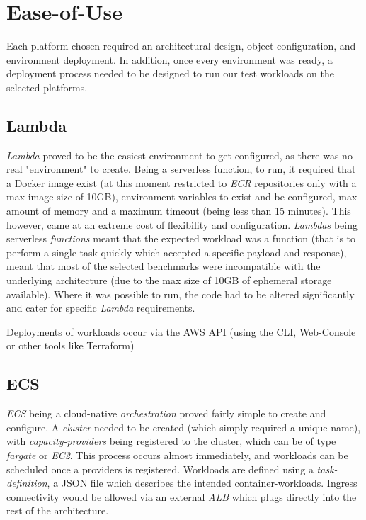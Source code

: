 \section{Ease-of-Use}
Each platform chosen required an architectural design, object configuration, and environment deployment.
In addition, once every environment was ready, a deployment process needed to be designed to run our test workloads on the selected platforms.

\subsection{Lambda}
\textit{Lambda} proved to be the easiest environment to get configured, as there was no real "environment" to create. Being a serverless function,
to run, it required that a Docker image exist (at this moment restricted to \textit{ECR} repositories only with a max image size of 10GB), environment variables to exist and be configured, max amount of memory
and a maximum timeout (being less than 15 minutes). This however, came at an extreme cost of flexibility and configuration.
\textit{Lambdas} being serverless \emph{functions} meant that the expected workload was a function (that is to perform a single task quickly which accepted a specific payload and response),
meant that most of the selected benchmarks were incompatible with the underlying architecture (due to the max size of 10GB of ephemeral storage available).
Where it was possible to run, the code had to be altered significantly and cater for specific \textit{Lambda} requirements.

Deployments of workloads occur via the AWS API (using the CLI, Web-Console or other tools like Terraform)

\subsection{ECS}
\textit{ECS} being a cloud-native \textit{orchestration} proved fairly simple to create and configure.
A \emph{cluster} needed to be created (which simply required a unique name), with \textit{capacity-providers} being registered to the cluster,
which can be of type \textit{fargate} or \textit{EC2}.
This process occurs almost immediately, and workloads can be scheduled once a providers is registered.
Workloads are defined using a \textit{task-definition}, a JSON file which describes the intended container-workloads.
Ingress connectivity would be allowed via an external \textit{ALB} which plugs directly into the rest of the architecture.

